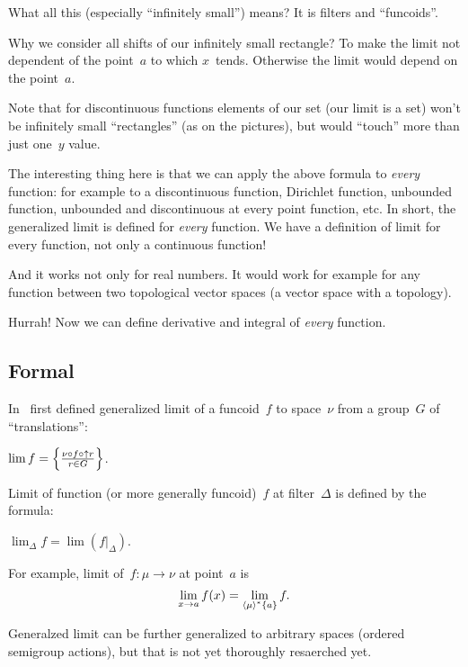 \documentclass{amsart}
\begin{document}
What all this (especially ``infinitely small'') means? It is filters and ``funcoids''.

Why we consider all shifts of our infinitely small rectangle? To make the limit not dependent of the point~$a$ to which $x$~tends. Otherwise the limit would depend on the point~$a$.

Note that for discontinuous functions elements of our set (our limit is a set) won't be infinitely small ``rectangles'' (as on the pictures), but would ``touch'' more than just one~$y$ value.

The interesting thing here is that we can apply the above formula to \emph{every} function: for example to a discontinuous function, Dirichlet function, unbounded function, unbounded and discontinuous at every point function, etc. In short, the generalized limit is defined for \emph{every} function. We have a definition of limit for every function, not only a continuous function!

And it works not only for real numbers. It would work for example for any function between two topological vector spaces (a vector space with a topology).

Hurrah! Now we can define derivative and integral of \emph{every} function.

\subsection{Formal}


In~\cite{volume-1-edition1} first defined generalized limit of
a funcoid~$f$ to space~$\nu$ from a group~$G$ of ``translations'':

\begin{defn}
$\lim f=\left\{ \frac{\nu\circ f\circ\uparrow r}{r\in G}\right\}$.
\end{defn}

Limit of function (or more generally funcoid)~$f$ at filter~$\Delta$ is defined by the formula:

\begin{defn}
$\lim_{\Delta} f=\lim(f|_{\Delta})$.
\end{defn}

For example, limit of~$f:\mu\to\nu$ at point~$a$ is
\[ \lim_{x\to a}f(x) = \lim_{\left\langle \mu\right\rangle ^{\ast}\{a\}}f. \]

Generalzed limit can be further generalized to arbitrary spaces
(ordered semigroup actions), but that is not yet thoroughly resaerched yet.
\end{document}
